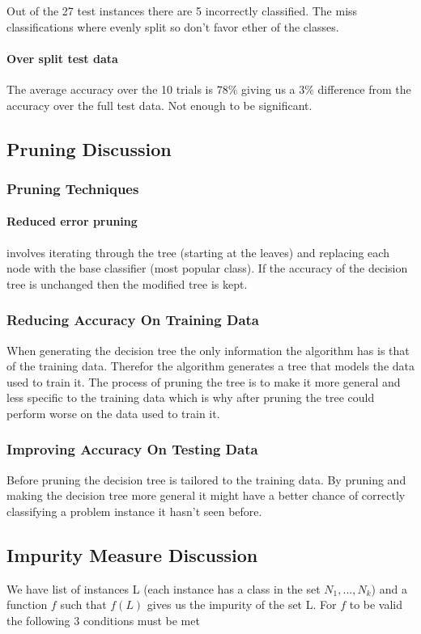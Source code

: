 \documentclass[a4paper, 12pt]{article}
\begin{document}
			Out of the 27 test instances there are 5 incorrectly classified. The miss classifications where evenly split so don't favor ether of the classes.
			
			\paragraph{Over split test data} The average accuracy over the 10 trials is $78\%$ giving us a $3\%$ difference from the accuracy over the full test data. Not enough to be significant.
  	
  		\subsection{Pruning Discussion}
  			\subsubsection{Pruning Techniques}
  				\paragraph{Reduced error pruning} involves iterating through the tree (starting at the leaves) and replacing each node with the base classifier (most popular class). If the accuracy of the decision tree is unchanged then the modified tree is kept.
  				
  			\subsubsection{Reducing Accuracy On Training Data}
  				When generating the decision tree the only information the algorithm has is that of the training data. Therefor the algorithm generates a tree that models the data used to train it. The process of pruning the tree is to make it more general and less specific to the training data which is why after pruning the tree could perform worse on the data used to train it.
  				
  			\subsubsection{Improving Accuracy On Testing Data}
  				Before pruning the decision tree is tailored to the training data. By pruning and making the decision tree more general it might have a better chance of correctly classifying a problem instance it hasn't seen before.
  			
  		\subsection{Impurity Measure Discussion}
			We have list of instances L (each instance has a class in the set $N_1,...,N_k$) and a function $f$ such that $f(L)$ gives us the impurity of the set L. For $f$ to be valid the following 3 conditions must be met
			
\end{document}
